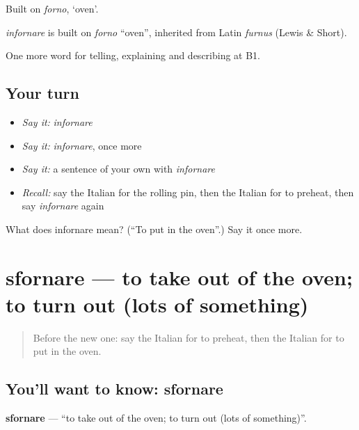 Built on \emph{forno}, ‘oven’.

\begin{cousinweb}
\emph{infornare} is built on \emph{forno} \textquotedblleft{}oven\textquotedblright{}, inherited from Latin \emph{furnus} (Lewis \& Short).
\end{cousinweb}

\begin{grammarlens}[title={What you've built}]
One more word for telling, explaining and describing at B1.
\end{grammarlens}

\subsection*{Your turn}
\begin{itemize}
\raggedright
  \item \emph{Say it:} \emph{infornare}
  \item \emph{Say it:} \emph{infornare}, once more
  \item \emph{Say it:} a sentence of your own with \emph{infornare}
  \item \emph{Recall:} say the Italian for the rolling pin, then the Italian for to preheat, then say \emph{infornare} again
\end{itemize}

\begin{tcolorbox}[breakable,colback=teal!4,colframe=teal!35!black,title={Before you move on}]
What does infornare mean? (\textquotedblleft{}To put in the oven\textquotedblright{}.) Say it once more.
\end{tcolorbox}
\section[sfornare]{sfornare — to take out of the oven; to turn out (lots of something)}

\label{lesson:IT-C336-sfornare}



\begin{quote}
Before the new one: say the Italian for to preheat, then the Italian for to put in the oven.
\end{quote}

\subsection*{You'll want to know: sfornare}
\textbf{sfornare} — \textquotedblleft{}to take out of the oven; to turn out (lots of something)\textquotedblright{}.

